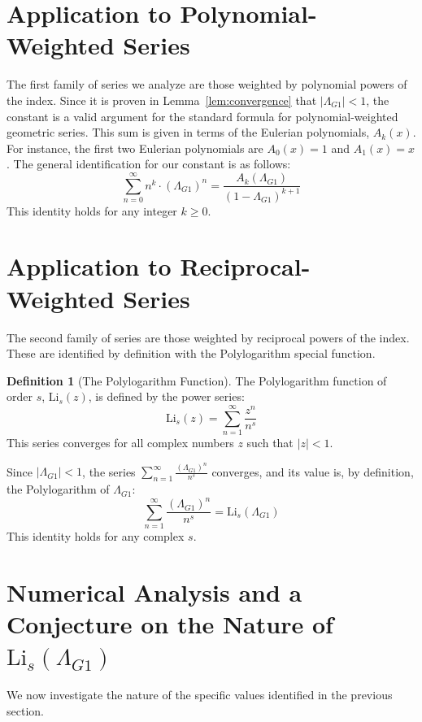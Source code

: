 \documentclass{amsart}
\theoremstyle{plain}
\theoremstyle{definition}
\newtheorem{definition}[theorem]{Definition}
\theoremstyle{remark}
\newcommand{\LambdaG}{\Lambda_{G1}}
\begin{document}
\section{Application to Polynomial-Weighted Series}
The first family of series we analyze are those weighted by polynomial powers of the index. Since it is proven in Lemma~\ref{lem:convergence} that $|\LambdaG|<1$, the constant is a valid argument for the standard formula for polynomial-weighted geometric series. This sum is given in terms of the Eulerian polynomials, $A_k(x)$. For instance, the first two Eulerian polynomials are $A_0(x)=1$ and $A_1(x)=x$. The general identification for our constant is as follows:
$$ \sum_{n=0}^{\infty} n^k \cdot (\LambdaG)^n = \frac{A_k(\LambdaG)}{(1-\LambdaG)^{k+1}} $$
This identity holds for any integer $k \ge 0$.

\section{Application to Reciprocal-Weighted Series}
The second family of series are those weighted by reciprocal powers of the index. These are identified by definition with the Polylogarithm special function.

\begin{definition}[The Polylogarithm Function]
The Polylogarithm function of order $s$, $\mathrm{Li}_s(z)$, is defined by the power series:
$$ \mathrm{Li}_s(z) = \sum_{n=1}^{\infty} \frac{z^n}{n^s} $$
This series converges for all complex numbers $z$ such that $|z|<1$.
\end{definition}

Since $|\LambdaG| < 1$, the series $\sum_{n=1}^{\infty} \frac{(\LambdaG)^{n}}{n^s}$ converges, and its value is, by definition, the Polylogarithm of $\LambdaG$:
$$ \sum_{n=1}^{\infty} \frac{(\LambdaG)^{n}}{n^s} = \mathrm{Li}_s(\LambdaG) $$
This identity holds for any complex $s$.

\section{Numerical Analysis and a Conjecture on the Nature of \texorpdfstring{$\mathrm{Li}_s(\LambdaG)$}{Li\_s(Lambda\_G1)}}
We now investigate the nature of the specific values identified in the previous section.
\end{document}
